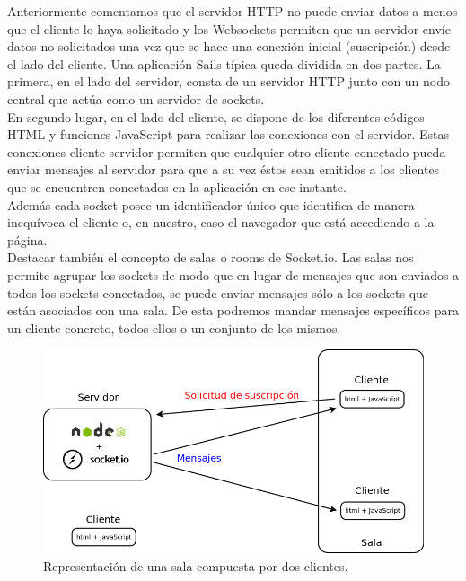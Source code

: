 \documentclass[a4paper,12pt]{article}
\begin{document}
Anteriormente comentamos que el servidor HTTP no puede enviar datos a menos que el cliente lo haya solicitado y los Websockets permiten que un servidor envíe datos no solicitados una vez que se hace 
una conexión inicial (suscripción) desde el lado del cliente. Una aplicación Sails típica queda dividida en dos partes. La primera, en el lado del servidor, consta de un servidor HTTP junto con un nodo
central que actúa como un servidor de sockets.\\ 

En segundo lugar, en el lado del cliente, se dispone de los diferentes códigos HTML y funciones JavaScript para realizar las conexiones con el servidor. Estas conexiones cliente-servidor permiten que 
cualquier otro cliente conectado pueda enviar mensajes al servidor para que a su vez éstos sean emitidos a los clientes que se encuentren conectados en la aplicación en ese instante.\\

Además cada socket posee un identificador único que identifica de manera inequívoca el cliente o, en nuestro, caso el navegador que está accediendo a la página.\\

Destacar también el concepto de salas o rooms de Socket.io. Las salas nos permite agrupar los sockets de modo que en lugar de mensajes que son enviados a todos los sockets conectados, se puede enviar mensajes
sólo a los sockets que están asociados con una sala. De esta podremos mandar mensajes específicos para un cliente concreto, todos ellos o un conjunto de los mismos. \\


\begin{figure}[H]
  \begin{center}
    \includegraphics[scale=0.35]{imagenes/salas-websocket.png}
  \end{center}
  \caption{Representación de una sala compuesta por dos clientes.}
  \label{view:userindex}
\end{figure}
\end{document}
